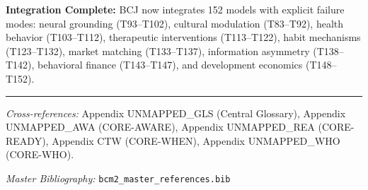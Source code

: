 \begin{tcolorbox}[colback=green!5!white, colframe=green!75!black,
    title=Complete Framework: 152 Theorems Across 29 Categories]
\textbf{Integration Complete:} BCJ now integrates 152 models with explicit failure modes: neural grounding (T93--T102), cultural modulation (T83--T92), health behavior (T103--T112), therapeutic interventions (T113--T122), habit mechanisms (T123--T132), market matching (T133--T137), information asymmetry (T138--T142), behavioral finance (T143--T147), and development economics (T148--T152).
\end{tcolorbox}



\vspace{1em}
\hrule
\vspace{0.5em}

\noindent\textit{Cross-references:}
Appendix UNMAPPED_GLS (Central Glossary),
Appendix UNMAPPED_AWA (CORE-AWARE),
Appendix UNMAPPED_REA (CORE-READY),
Appendix CTW (CORE-WHEN),
Appendix UNMAPPED_WHO (CORE-WHO).

\noindent\textit{Master Bibliography:} \texttt{bcm2\_master\_references.bib}

